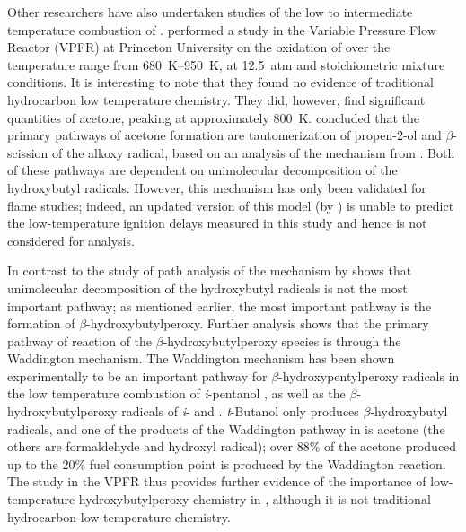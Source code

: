 \documentclass[12pt, letterpaper]{article}
\begin{document}
Other researchers have also undertaken studies of the low to intermediate
temperature combustion of \tBuOH{}. \textcite{Lefkowitz2012}
performed a study in the Variable Pressure Flow Reactor (VPFR) at Princeton
University on the oxidation of \tBuOH{} over the temperature range
from \SIrange{680}{950}{\kelvin}, at \SI{12.5}{atm} and stoichiometric mixture conditions. It is
interesting to note that they found no evidence of traditional hydrocarbon
low temperature chemistry. They did, however, find significant quantities of
acetone, peaking at approximately \SI{800}{\kelvin}. \textcite{Lefkowitz2012} concluded
that the primary pathways of acetone formation are tautomerization of
propen-2-ol and $\beta$-scission of the alkoxy radical, based on an analysis
of the mechanism from \textcite{Grana2010}. Both of these pathways are
dependent on unimolecular decomposition of the hydroxybutyl radicals. However,
this mechanism has only been validated for flame studies; indeed, an updated
version of this model (by \textcite{Frassoldati2012}) is unable to predict the
low-temperature ignition delays measured in this study and hence is not
considered for analysis.

In contrast to the study of \textcite{Lefkowitz2012} path analysis of the
mechanism by \textcite{Sarathy2012} shows that unimolecular decomposition
of the hydroxybutyl radicals is not the most important pathway; as mentioned
earlier, the most important pathway is the formation of
$\beta$-hydroxybutylperoxy. Further analysis shows that the primary pathway of
reaction of the \tBuOH{} $\beta$-hydroxybutylperoxy species is
through the Waddington mechanism. The Waddington mechanism has been shown
experimentally to be an important pathway for $\beta$-hydroxypentylperoxy
radicals in the low temperature combustion of \textit{i}-pentanol
\cite{Welz2012}, as well as the $\beta$-hydroxybutylperoxy radicals of
\textit{i}- and \tBuOH{} \cite{Welz2013b}. \textit{t}-Butanol only
produces $\beta$-hydroxybutyl radicals, and one of the products of the
Waddington pathway in \tBuOH{} is acetone (the others are
formaldehyde and hydroxyl radical); over 88\% of the acetone produced up to the
20\% fuel consumption point is produced by the Waddington reaction. The study
in the VPFR thus provides further evidence of the importance of low-temperature
hydroxybutylperoxy chemistry in \tBuOH{}, although it is not
traditional hydrocarbon low-temperature chemistry.
\end{document}
